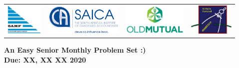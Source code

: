 \documentclass{article}
\begin{document}
\setlength{\tabcolsep}{5pt}
\begin{center} \begin{tabular}{cccc}
	\includegraphics[height=43pt]{SAMF_logo.jpg} &
	\includegraphics[height=43pt]{SAICA_logo.jpg} &
	\includegraphics[height=43pt]{OM_Logo_Stacked_Vignette_on_White_RGB.jpg} &
	\includegraphics[height=43pt]{SAMO2019.png}
\end{tabular} \end{center}

\bigskip

\begin{center}
\textbf{\Large An Easy Senior Monthly Problem Set :)}
\\ \vspace{1em}
\textbf{\large Due: XX, XX XX 2020}
\end{center}
\end{document}
